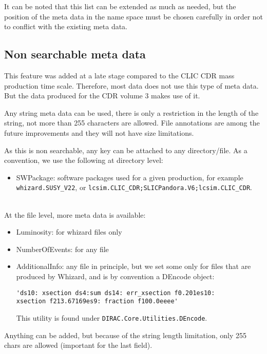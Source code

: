 \documentclass[11pt,a4paper]{scrartcl}
\begin{document}
It can be noted that this list can be extended as much as needed, but the
position of the meta data in the name space must be chosen carefully in order
not to conflict with the existing meta data.

\subsection{Non searchable meta data}
This feature was added at a late stage compared to the CLIC CDR mass production
time scale. Therefore, most data does not use this type of meta data. But the
data produced for the CDR volume 3 makes use of it. 

Any string meta data can be used, there is only a restriction in the length of
the string, not more than 255 characters are allowed. File annotations are among
the future improvements and they will not have size limitations.

As this is non searchable, any key can be attached to any directory/file. As a
convention, we use the following at directory level:
\begin{itemize}
  \item SWPackage: software packages used for a given production, for example\\
  \lstinline|whizard.SUSY_V22|, or
  \lstinline|lcsim.CLIC_CDR;SLICPandora.V6;lcsim.CLIC_CDR|.
\end{itemize}

~\\

At the file level, more meta data is available:
\begin{itemize}
  \item Luminosity: for whizard files only
  \item NumberOfEvents: for any file
  \item AdditionalInfo: any file in principle, but we set some only
  for files that are produced by Whizard, and is by convention a
  DEncode object: \\ 
  \begin{lstlisting}
'ds10: xsection ds4:sum ds14: err_xsection f0.201es10:
xsection f213.67169es9: fraction f100.0eeee'
  \end{lstlisting}
  This utility is found under \lstinline|DIRAC.Core.Utilities.DEncode|.
\end{itemize}
Anything can be added, but because of the string length limitation, only 255
chars are allowed (important for the last field).

~\\
\end{document}
